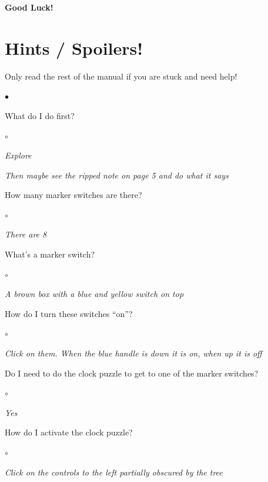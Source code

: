 \documentclass{book}
\newenvironment{list1}%
{\begin{list}{$\bullet$}{\setlength{\parsep}{0.05ex}\setlength{\itemsep}{0mm}}}
{\end{list}\normalsize}
\newenvironment{list2}%
{\begin{list}{$\circ$}{\setlength{\parsep}{0.05ex}\setlength{\itemsep}{0mm}}}
{\end{list}\normalsize}
\begin{document}
\begin{center}
{\bf Good Luck!}
\end{center}

\pagebreak

\section*{Hints / Spoilers!}

\noindent
Only read the rest of the manual if you are stuck and need help!
\vfill

\pagebreak

\begin{list1}
	\item What do I do first?
	\begin{list2}
		\item {\em Explore}
		\item {\em  Then maybe see the ripped note on page 5
			and do what it says}
	\end{list2}
	\item How many marker switches are there?
	\begin{list2}
		\item {\em There are 8}
	\end{list2}

	\item What's a marker switch?
	\begin{list2}
		\item {\em A brown box with a blue and yellow switch on top}
	\end{list2}
\pagebreak
	\item How do I turn these switches ``on''?
	\begin{list2}
		\item {\em Click on them.  When the blue handle is down
			it is on, when up it is off}
	\end{list2}

	\item Do I need to do the clock puzzle to get to one of the marker
		switches?
	\begin{list2}
		\item {\em Yes}
	\end{list2}

	\item How do I activate the clock puzzle?
	\begin{list2}
		\item {\em Click on the controls to the left
		partially obscured by the tree}
	\end{list2}


\end{list1}
\end{document}
